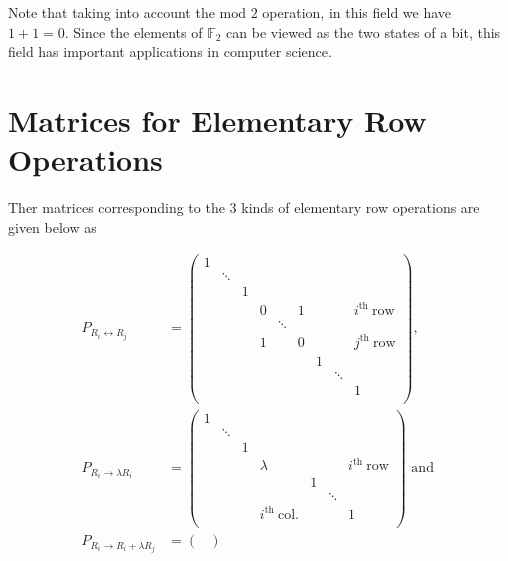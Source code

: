 \documentclass[a4paper,12pt]{report}
\begin{document}
\begin{appendices}
Note that taking into account the \(\text{mod } 2 \) operation, in this field we have \(1+1 = 0\). Since the elements of \(\mathbb{F}_{2}  \) can be viewed as the two states of a bit, this field has important applications in computer science. 

\section{Matrices for Elementary Row Operations} \label{APA} 

Ther matrices corresponding to the 3 kinds of elementary row operations are given below as

\begin{equation}
    \begin{aligned}
    P_{R_{i} \leftrightarrow R_{j}  } &= \begin{pmatrix}
        1 &  &  &  &  &  &  &  &   \\
         & \ddots  &  &  &  &  &  &  &   \\
         &  & 1 &  &  &  &  &  &   \\
         &  &  & 0 &  & 1 &  &  & i^{\text{th }}\text{row}    \\
         &  &  &  & \ddots  &  &  &  &   \\
         &  &  & 1 &  & 0 &  &  & j^{\text{th }}\text{row}   \\
         &  &  &  &  &  & 1 &  &   \\
         &  &  &  &  &  &  & \ddots  &   \\
         &  &  &  &  &  &  &  &  1 \\
    \end{pmatrix}, \\
    P_{R_{i} \rightarrow \lambda R_{i}  } &= \begin{pmatrix}
        1 &  &  &  &  &  &   \\
         & \ddots  &  &  &  &  &   \\
         &  & 1 &  &  &  &   \\
         &  &  & \lambda  &  &  & i^{\text{th }}\text{row}   \\
         &  &  &  & 1 &  &   \\
         &  &  &  &  & \ddots  &   \\
         &  &  & i^{\text{th }}\text{col.}  &  &  &  1 \\
    \end{pmatrix} \text { and } \\
    P_{R_{i} \rightarrow R_{i}+\lambda R_{j}   } &= \begin{pmatrix}

\end{pmatrix}
\end{aligned}
\end{equation}
\end{appendices}
\end{document}
